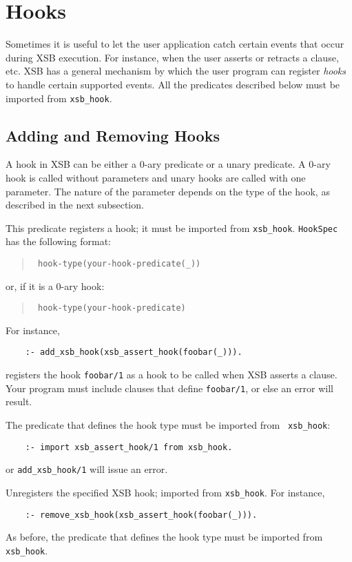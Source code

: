 \chapter{Hooks} \label{hooks}

Sometimes it is useful to let the user application catch certain
events that occur during XSB execution. For instance, when the user
asserts or retracts a clause, etc.  XSB has a general mechanism by
which the user program can register \emph{hooks} to handle certain
supported events. All the predicates described below must be imported
from {\tt xsb\_hook}.


\section{Adding and Removing Hooks}

A hook in XSB can be either a 0-ary predicate or a unary predicate.
A 0-ary hook is called without parameters and unary hooks are called with
one parameter. The nature of the parameter depends on the type of the hook,
as described in the next subsection.


\begin{description}

This predicate registers a hook; it must be imported from {\tt xsb\_hook}.
{\tt HookSpec} has the following format:
\begin{quote}
 {\tt
   hook-type(your-hook-predicate(\_))
   }
\end{quote}
or, if it is a 0-ary hook:
\begin{quote}
  {\tt
   hook-type(your-hook-predicate)
   }  
\end{quote}
For instance, 
\begin{verbatim}
    :- add_xsb_hook(xsb_assert_hook(foobar(_))).
\end{verbatim}
registers the hook {\tt foobar/1} as a hook to be called when XSB
asserts a clause. Your program must include
clauses that define {\tt foobar/1}, or else an error will result.

The predicate that defines the hook type must be imported from {\tt
  xsb\_hook}:
\begin{verbatim}
    :- import xsb_assert_hook/1 from xsb_hook.  
\end{verbatim}
or {\tt add\_xsb\_hook/1} will issue an error.


Unregisters the specified XSB hook; imported from {\tt xsb\_hook}. For
instance,
\begin{verbatim}
    :- remove_xsb_hook(xsb_assert_hook(foobar(_))).
\end{verbatim}
As before, the predicate that defines the hook type must be imported from
{\tt xsb\_hook}.
\end{description}


